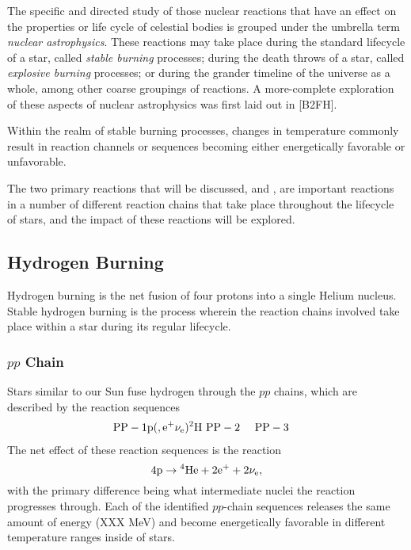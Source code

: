 

The specific and directed study of those nuclear reactions that have an effect
on the properties or life cycle of celestial bodies is grouped under the
umbrella term \emph{nuclear astrophysics}. These reactions may take place
during the standard lifecycle of a star, called \emph{stable burning}
processes; during the death throws of a star, called \emph{explosive burning}
processes; or during the grander timeline of the universe as a whole, among
other coarse groupings of reactions. A more-complete exploration of these
aspects of nuclear astrophysics was first laid out in [B2FH].

Within the realm of stable burning processes, changes in temperature commonly
result in reaction channels or sequences becoming either energetically
favorable or unfavorable.

The two primary reactions that will
be discussed, \alpa{} and \nag{},
are important reactions in a number of different reaction chains that take
place throughout the lifecycle of stars, and the impact of these reactions will
be explored.

\subsection{Hydrogen Burning}

Hydrogen burning is the net fusion of four protons into a single Helium
nucleus. Stable hydrogen burning is the process wherein the reaction chains
involved take place within a star during its regular lifecycle.

\subsubsection{$pp$ Chain}

Stars similar to our Sun fuse hydrogen through the $pp$ chains, which are
described by the reaction sequences
\begin{align*}
    \rm{PP-1}& \rm{p}(\rm,e^+\nu_e){}^{2}\textrm{H} \
    \rm{PP-2}& \
    \rm{PP-3}&
\end{align*}
The net effect of these reaction sequences is the reaction
\[
    4\rm{p} \rightarrow {}^{4}\textrm{He} + 2e^+ + 2\nu_e,
\]
with the primary difference being what intermediate nuclei the reaction
progresses through. Each of the identified $pp$-chain sequences releases the
same amount of energy (XXX MeV) and become energetically favorable in different
temperature ranges inside of stars.

